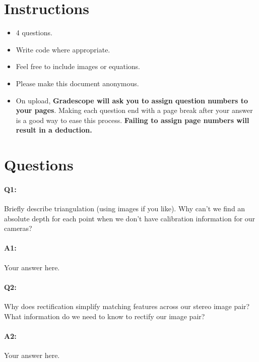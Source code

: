 \section*{Instructions}
\begin{itemize}
  \item 4 questions.
  \item Write code where appropriate.
  \item Feel free to include images or equations.
  \item Please make this document anonymous.
  \item On upload, \textbf{Gradescope will ask you to assign question numbers to your pages}. Making each question end with a page break after your answer is a good way to ease this process. \textbf{Failing to assign page numbers will result in a deduction.}
\end{itemize}

\section*{Questions}


\paragraph{Q1:} Briefly describe triangulation (using images if you like). Why can't we find an absolute depth for each point when we don't have calibration information for our cameras?

\paragraph{A1:} Your answer here.




\pagebreak
\paragraph{Q2:} Why does rectification simplify matching features across our stereo image pair? What information do we need to know to rectify our image pair?

\paragraph{A2:} Your answer here.





